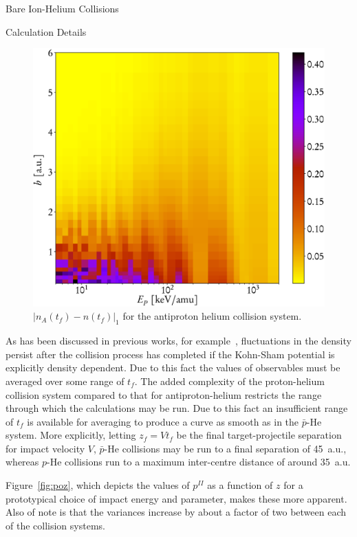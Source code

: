 \documentclass[letterpaper, 11 pt]{report}
\begin{document}
\begin{chapter}{Bare Ion-Helium Collisions \label{chap:p-he2p-he}}
\begin{section}{Calculation Details \label{sec:phe2p-det}}
\begin{figure}[t]
\begin{minipage}{.49\linewidth}
            \centering
            \includegraphics[width = \linewidth]{./images/dendiff.eps}
            \caption[Density difference]
                   {$\left| n_A(t_f) - n (t_f)\right|_1$ for the antiproton
                    helium collision system. \label{fig:l1}}
         \end{minipage}
      \end{figure}

      As has been discussed in previous works, for example~\cite{microresp,pbarhe}, fluctuations in the
      density persist after the collision process has completed if the Kohn-Sham potential is explicitly
      density dependent. Due to this fact the values of observables must be averaged over some range of
      $t_f$. The added complexity of the proton-helium collision system compared to that for
      antiproton-helium restricts the range through which the calculations may be run. Due to this fact
      an insufficient range of $t_f$ is available for averaging to produce a curve as smooth as in the
      $\bar{p}$-He system. More explicitly, letting $z_f = V t_f$ be the final target-projectile
      separation for impact velocity $V$, $\bar{p}$-He collisions may be run to a final separation of
      45~a.u., whereas $p$-He collisions run to a maximum inter-centre distance of around 35~a.u.

      Figure~\ref{fig:poz}, which depicts the values of $p^{II}$ as a function of $z$ for a prototypical
      choice of impact energy and parameter, makes these more apparent. Also of note is that the
      variances increase by about a factor of two between each of the collision systems.


\end{section}
\end{chapter}
\end{document}
